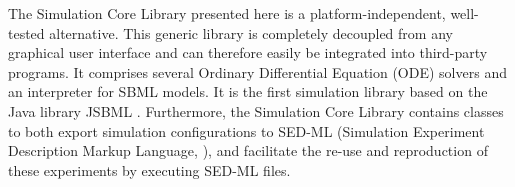 \documentclass{bioinfo}
\begin{document}

The Simulation Core Library presented here is a platform-independent,
well-tested alternative.
This generic library is completely decoupled from any graphical user interface
and can therefore easily be integrated into third-party programs.
It comprises several Ordinary Differential Equation (ODE)
solvers and an interpreter for SBML models. It is the first simulation library
based on the Java library JSBML \citep{Draeger2011b}.
%
%
Furthermore, the Simulation Core Library contains classes to both export
simulation configurations to SED-ML (Simulation Experiment Description Markup Language,
\citealp{Waltemath2011}), and facilitate the re-use and reproduction of these
experiments by executing SED-ML files.
\end{document}
